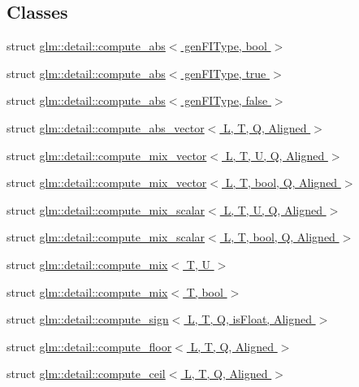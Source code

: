 \subsection*{Classes}
\begin{DoxyCompactItemize}
\item 
struct \hyperlink{structglm_1_1detail_1_1compute__abs}{glm\+::detail\+::compute\+\_\+abs$<$ gen\+F\+I\+Type, bool $>$}
\item 
struct \hyperlink{structglm_1_1detail_1_1compute__abs_3_01genFIType_00_01true_01_4}{glm\+::detail\+::compute\+\_\+abs$<$ gen\+F\+I\+Type, true $>$}
\item 
struct \hyperlink{structglm_1_1detail_1_1compute__abs_3_01genFIType_00_01false_01_4}{glm\+::detail\+::compute\+\_\+abs$<$ gen\+F\+I\+Type, false $>$}
\item 
struct \hyperlink{structglm_1_1detail_1_1compute__abs__vector}{glm\+::detail\+::compute\+\_\+abs\+\_\+vector$<$ L, T, Q, Aligned $>$}
\item 
struct \hyperlink{structglm_1_1detail_1_1compute__mix__vector}{glm\+::detail\+::compute\+\_\+mix\+\_\+vector$<$ L, T, U, Q, Aligned $>$}
\item 
struct \hyperlink{structglm_1_1detail_1_1compute__mix__vector_3_01L_00_01T_00_01bool_00_01Q_00_01Aligned_01_4}{glm\+::detail\+::compute\+\_\+mix\+\_\+vector$<$ L, T, bool, Q, Aligned $>$}
\item 
struct \hyperlink{structglm_1_1detail_1_1compute__mix__scalar}{glm\+::detail\+::compute\+\_\+mix\+\_\+scalar$<$ L, T, U, Q, Aligned $>$}
\item 
struct \hyperlink{structglm_1_1detail_1_1compute__mix__scalar_3_01L_00_01T_00_01bool_00_01Q_00_01Aligned_01_4}{glm\+::detail\+::compute\+\_\+mix\+\_\+scalar$<$ L, T, bool, Q, Aligned $>$}
\item 
struct \hyperlink{structglm_1_1detail_1_1compute__mix}{glm\+::detail\+::compute\+\_\+mix$<$ T, U $>$}
\item 
struct \hyperlink{structglm_1_1detail_1_1compute__mix_3_01T_00_01bool_01_4}{glm\+::detail\+::compute\+\_\+mix$<$ T, bool $>$}
\item 
struct \hyperlink{structglm_1_1detail_1_1compute__sign}{glm\+::detail\+::compute\+\_\+sign$<$ L, T, Q, is\+Float, Aligned $>$}
\item 
struct \hyperlink{structglm_1_1detail_1_1compute__floor}{glm\+::detail\+::compute\+\_\+floor$<$ L, T, Q, Aligned $>$}
\item 
struct \hyperlink{structglm_1_1detail_1_1compute__ceil}{glm\+::detail\+::compute\+\_\+ceil$<$ L, T, Q, Aligned $>$}

\end{DoxyCompactItemize}

